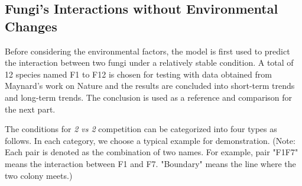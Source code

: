 \documentclass[a4paper,12pt]{article}
\begin{document}
\subsection{Fungi's Interactions without Environmental Changes}
Before considering the environmental factors, the model is first used to predict the interaction between two fungi under a relatively stable condition. A total of 12 species named F1 to F12 is chosen for testing with data obtained from Maynard's work on Nature \cite{Nature} and the results are concluded into short-term trends and long-term trends. The conclusion is used as a reference and comparison for the next part.

The conditions for \textit{2 vs 2} competition can be categorized into four types as follows. In each category, we choose a typical example for demonstration. (Note: Each pair is denoted as the combination of two names. For example, pair "F1F7" means the interaction between F1 and F7. "Boundary" means the line where the two colony meets.)
\end{document}

